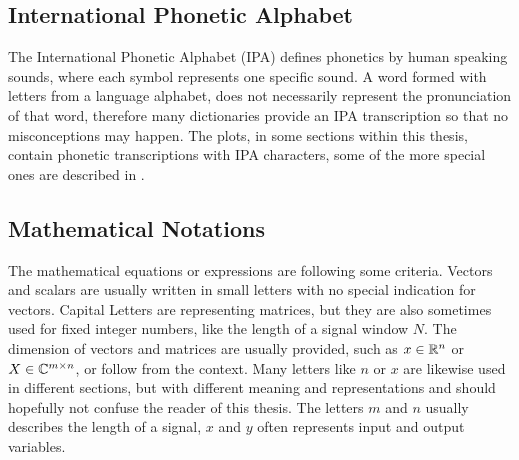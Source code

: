 
\subsection{International Phonetic Alphabet}\label{sec:intro_overview_ipa}
The International Phonetic Alphabet (IPA) defines phonetics by human speaking sounds, where each symbol represents one specific sound.
A word formed with letters from a language alphabet, does not necessarily represent the pronunciation of that word, therefore many dictionaries provide an IPA transcription so that no misconceptions may happen.
The plots, in some sections within this thesis, contain phonetic transcriptions with IPA characters, some of the more special ones are described in .



\subsection{Mathematical Notations}\label{sec:intro_overview_math}
The mathematical equations or expressions are following some criteria.
Vectors and scalars are usually written in small letters with no special indication for vectors.
Capital Letters are representing matrices, but they are also sometimes used for fixed integer numbers, like the length of a signal window $N$.
The dimension of vectors and matrices are usually provided, such as $x\in\mathbb{R}^n$ or $X\in\mathbb{C}^{m \times n}$, or follow from the context.
Many letters like $n$ or $x$ are likewise used in different sections, but with different meaning and representations and should hopefully not confuse the reader of this thesis.
The letters $m$ and $n$ usually describes the length of a signal, $x$  and $y$ often represents input and output variables.
